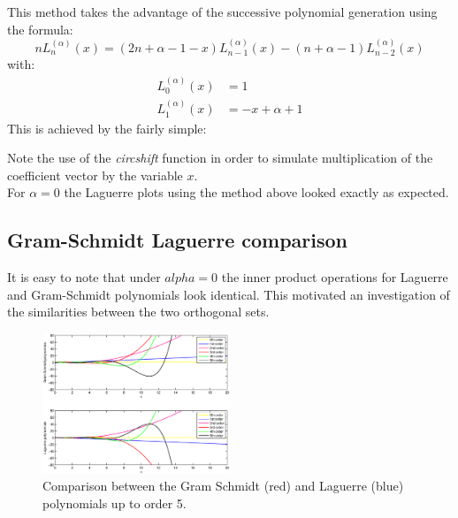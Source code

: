 \documentclass[a4paper]{article}
\numberwithin{equation}{section}
\begin{document}
This method takes the advantage of the successive polynomial generation using the formula:
\begin{equation}
n L_n^{(\alpha)}(x) = (2n + \alpha - 1 - x) L_{n-1}^{(\alpha)}(x) - (n + \alpha - 1) L_{n-2}^{(\alpha)}(x)
\end{equation}
with:
\begin{align}
L_0^{(\alpha)}(x) &= 1 \\
L_1^{(\alpha)}(x) &= -x+\alpha+1
\end{align}
This is achieved by the fairly simple:


\noindent Note the use of the \textit{circshift} function in order to simulate multiplication of the coefficient vector by the variable $x$.\\
For $\alpha = 0$ the Laguerre plots using the method above looked exactly as expected.

\subsection{Gram-Schmidt Laguerre comparison}

It is easy to note that under $alpha = 0$ the inner product operations for Laguerre and Gram-Schmidt polynomials look identical. This motivated an investigation of the similarities between the two orthogonal sets.

\begin{figure}[!h]
\centering
\includegraphics[width=0.5\textwidth]{gs_laguerre_comparison.eps}
\caption{\label{fig:gslaguerrecomparison}Comparison between the Gram Schmidt (red) and Laguerre (blue) polynomials up to order 5.}
\end{figure}
\end{document}
